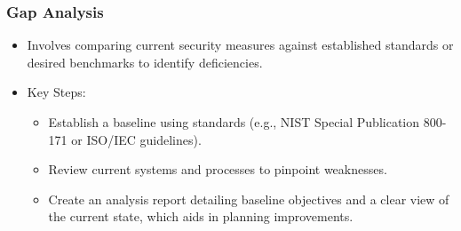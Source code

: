 \documentclass[11pt]{article}
\begin{document}
\subsubsection{Gap Analysis}
\label{sec:org5cfd5e1}
\begin{itemize}
\item Involves comparing current security measures against established standards or desired benchmarks to identify deficiencies.
\item Key Steps:
\begin{itemize}
\item Establish a baseline using standards (e.g., NIST Special Publication 800-171 or ISO/IEC guidelines).
\item Review current systems and processes to pinpoint weaknesses.
\item Create an analysis report detailing baseline objectives and a clear view of the current state, which aids in planning improvements.
\end{itemize}
\end{itemize}
\end{document}
